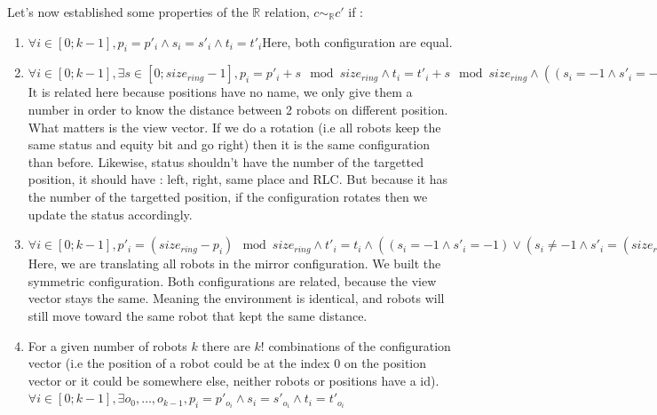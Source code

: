 \documentclass{article}
\begin{document}
Let's now established some properties of the $\mathbb{R}$ relation, $c \sim_{\mathbb{R}} c'$ if :
\begin{enumerate}
    \item $\forall i \in [0;k-1], p_{i} = p'_{i} \land s_{i} = s'_{i} \land t_{i} = t'_{i}$\newline Here, both configuration are equal.
    \item $\forall i \in [0;k-1], \exists s \in [0; size_{ring}-1], p_{i} = p'_{i} + s \mod{size_{ring}} \land t_{i} = t'_{i} + s \mod{size_{ring}} \land ((s_{i} = -1 \land s'_{i} = -1) \lor (s'_{i} \not= -1 \land s_{i} = s'_{i} + s \mod{size_{ring}}))$\newline It is related here because positions have no name, we only give them a number in order to know the distance between 2 robots on different position. What matters is the view vector. If we do a rotation (i.e all robots keep the same status and equity bit and go right) then it is the same configuration than before. Likewise, status shouldn't have the number of the targetted position, it should have : left, right, same place and RLC. But because it has the number of the targetted position, if the configuration rotates then we update the status accordingly.
    \item $\forall i \in [0; k-1], p'_{i} = (size_{ring} - p_{i})\mod{size_{ring}} \land t'_{i} = t_{i} \land ((s_{i} = -1 \land s'_{i} = -1) \lor (s_{i} \not= -1 \land s'_{i} = (size_{ring} - s_{i})\mod{size_{ring}}))$\newline Here, we are translating all robots in the mirror configuration. We built the symmetric configuration. Both configurations are related, because the view vector stays the same. Meaning the environment is identical, and robots will still move toward the same robot that kept the same distance.
    \item For a given number of robots $k$ there are $k!$ combinations of the configuration vector (i.e the position of a robot could be at the index 0 on the position vector or it could be somewhere else, neither robots or positions have a id).\newline $\forall i \in [0;k-1], \exists o_{0},\dots, o_{k-1}, p_{i} = p'_{o_{i}} \land s_{i} = s'_{o_{i}} \land t_{i} = t'_{o_{i}} $
\end{enumerate}
\end{document}
